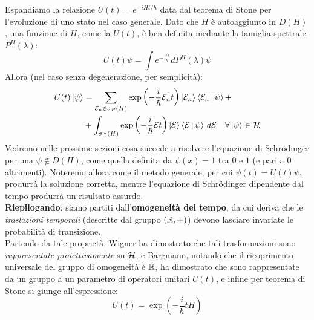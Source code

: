 \documentclass[../../FisicaTeorica.tex]{subfiles}
\begin{document}
Espandiamo la relazione $U(t) = e^{-iHt/\hbar}$ data dal teorema di Stone per l'evoluzione di uno stato nel caso generale. Dato che $H$ è autoaggiunto in $D\left(H\right)$, una funzione di $H$, come la $U(t)$, è ben definita mediante la famiglia spettrale $P^H\left(\lambda\right)$:
        \[
        U\left(t\right)\psi =\int e^{-\frac{it\lambda}{\hbar}}dP^H\left(\lambda\right)\psi 
        \]
        Allora (nel caso senza degenerazione, per semplicità):
        \begin{align}\nonumber
        U(t)\Ket{\psi} &= \sum_{\mathcal{E}_n \in \sigma_P(H)} \exp\left (-\frac{i}{\hbar}\mathcal{E}_n t\right) \Ket{\mathcal{E}_n}\Braket{\mathcal{E}_n |\psi} +\\
        &+ 
        \int_{\sigma_C(H)} \exp\left(-\frac{i}{\hbar}\mathcal{E}t\right ) \Ket{\mathcal{E}}\Braket{\mathcal{E}|\psi}\, d\mathcal{E} \quad \forall \Ket{\psi}\in \mathcal{H}
        \label{eqn:evoluzionetemporale_nodeg}
        \end{align}
Vedremo nelle prossime sezioni %
cosa succede a risolvere l'equazione di Schrödinger per una $\psi \notin D(H)$, come quella definita da $\psi(x)=1$ tra $0$ e $1$ (e pari a $0$ altrimenti). Noteremo allora come il metodo generale, per cui $\psi(t)=U(t)\psi$, produrrà la soluzione corretta, mentre l'equazione di Schr\"odinger dipendente dal tempo produrrà un risultato assurdo.\\

\textbf{Riepilogando}: siamo partiti dall'\textbf{omogeneità del tempo}, da cui deriva che le \textit{traslazioni temporali} (descritte dal gruppo $(\mathbb{R},+)$) devono lasciare invariate le probabilità di transizione.\\
Partendo da tale proprietà, Wigner ha dimostrato che  tali trasformazioni sono \textit{rappresentate proiettivamente} su $\mathcal{H}$, e Bargmann, notando che il ricoprimento universale del gruppo di omogeneità è $\mathbb{R}$, ha dimostrato che sono rappresentate da un gruppo a un parametro di operatori unitari $U(t)$, e infine per teorema di Stone si giunge all'espressione:
\[
U(t)=\exp\left(-\frac{i}{\hbar}tH\right)
\]
\end{document}
